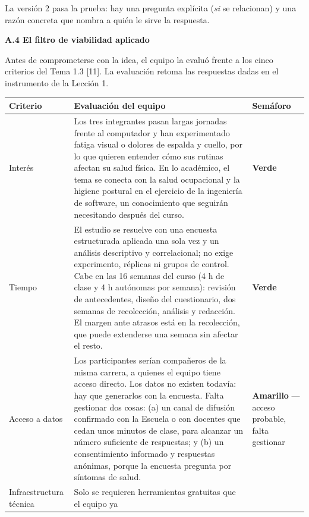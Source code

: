 \medskip
\noindent La versión 2 pasa la prueba: hay una pregunta explícita (\emph{si} se
relacionan) y una razón concreta que nombra a quién le sirve la respuesta.

\bigskip
\noindent\textbf{A.4 El filtro de viabilidad aplicado}

\noindent Antes de comprometerse con la idea, el equipo la evaluó frente a los cinco
criterios del Tema 1.3 [11]. La evaluación retoma las respuestas dadas en el
instrumento de la Lección 1.

\begin{center}
\begin{longtable}{L{2.5cm} L{9.3cm} L{2.2cm}}
\toprule
\textbf{Criterio} & \textbf{Evaluación del equipo} & \textbf{Semáforo}\\
\midrule
\endhead
Interés & Los tres integrantes pasan largas jornadas frente al computador y han
experimentado fatiga visual o dolores de espalda y cuello, por lo que quieren
entender cómo sus rutinas afectan su salud física. En lo académico, el tema se
conecta con la salud ocupacional y la higiene postural en el ejercicio de la
ingeniería de software, un conocimiento que seguirán necesitando después del curso.
& \textcolor{greensignal}{\textbf{Verde}}\\
\midrule
Tiempo & El estudio se resuelve con una encuesta estructurada aplicada una sola vez
y un análisis descriptivo y correlacional; no exige experimento, réplicas ni grupos
de control. Cabe en las 16 semanas del curso (4 h de clase y 4 h autónomas por
semana): revisión de antecedentes, diseño del cuestionario, dos semanas de
recolección, análisis y redacción. El margen ante atrasos está en la recolección,
que puede extenderse una semana sin afectar el resto.
& \textcolor{greensignal}{\textbf{Verde}}\\
\midrule
Acceso a datos & Los participantes serían compañeros de la misma carrera, a quienes
el equipo tiene acceso directo. Los datos no existen todavía: hay que generarlos con
la encuesta. Falta gestionar dos cosas: (a) un canal de difusión confirmado con la
Escuela o con docentes que cedan unos minutos de clase, para alcanzar un número
suficiente de respuestas; y (b) un consentimiento informado y respuestas anónimas,
porque la encuesta pregunta por síntomas de salud.
& \textcolor{yellowsignal}{\textbf{Amarillo}} --- acceso probable, falta gestionar\\
\midrule
Infraestructura técnica & Solo se requieren herramientas gratuitas que el equipo ya

\end{longtable}
\end{center}
